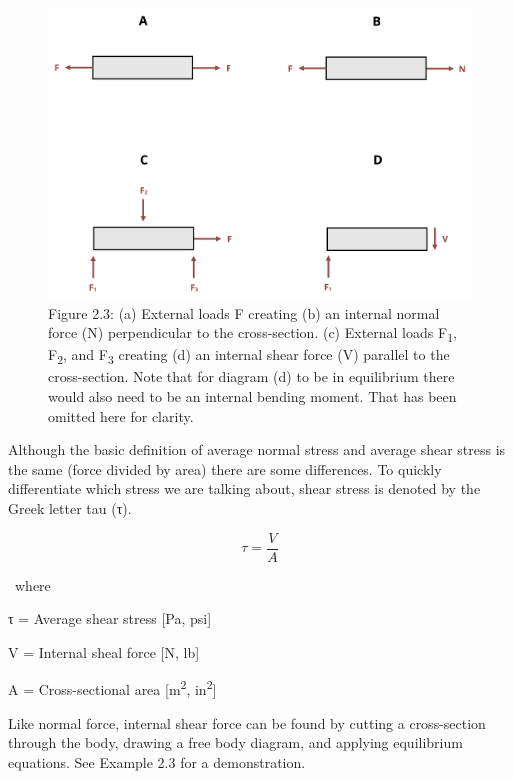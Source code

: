 \documentclass[
  letterpaper,
  DIV=11,
  numbers=noendperiod]{scrreprt}
\begin{document}
\begin{figure}[H]

{\centering \includegraphics{images/CH2 figures/2.3.png}

}

\caption{Figure 2.3: (a) External loads F creating (b) an internal
normal force (N) perpendicular to the cross-section. (c) External loads
F\textsubscript{1}, F\textsubscript{2}, and F\textsubscript{3} creating
(d) an internal shear force (V) parallel to the cross-section. Note that
for diagram (d) to be in equilibrium there would also need to be an
internal bending moment. That has been omitted here for clarity.}

\end{figure}%

Although the basic definition of average normal stress and average shear
stress is the same (force divided by area) there are some differences.
To quickly differentiate which stress we are talking about, shear stress
is denoted by the Greek letter tau (τ).

\[
\tau=\frac{V}{A}
\]

\,\,\,where \,\,\,\,\,\,\,\,\,\,\,

τ = Average shear stress {[}Pa, psi{]} \,\,\,\,\,\,\,\,\,\,\,

V = Internal sheal force {[}N, lb{]} \,\,\,\,\,\,\,\,\,\,\,

A = Cross-sectional area {[}m\textsuperscript{2},
in\textsuperscript{2}{]}

Like normal force, internal shear force can be found by cutting a
cross-section through the body, drawing a free body diagram, and
applying equilibrium equations. See Example 2.3 for a demonstration.
\end{document}

